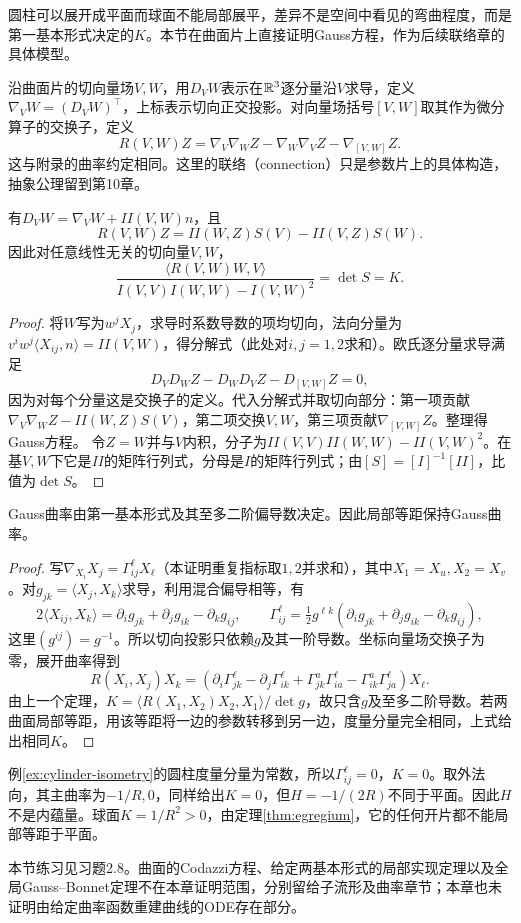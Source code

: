 圆柱可以展开成平面而球面不能局部展平，差异不是空间中看见的弯曲程度，而是第一基本形式决定的$K$。本节在曲面片上直接证明Gauss方程，作为后续联络章的具体模型。
\begin{definition}[切向投影联络与曲率]
沿曲面片的切向量场$V,W$，用$D_VW$表示在$\mathbb{R}^3$逐分量沿$V$求导，定义$\nabla_VW=(D_VW)^\top$，上标表示切向正交投影。对向量场括号$[V,W]$取其作为微分算子的交换子，定义
\[
 R(V,W)Z=\nabla_V\nabla_WZ-\nabla_W\nabla_VZ-\nabla_{[V,W]}Z.
\]
这与附录的曲率约定相同。这里的联络（connection）只是参数片上的具体构造，抽象公理留到第10章。
\end{definition}
\begin{theorem}[Gauss分解与Gauss方程]\label{thm:gauss-surface}
有$D_VW=\nabla_VW+II(V,W)n$，且
\[
 R(V,W)Z=II(W,Z)S(V)-II(V,Z)S(W).
\]
因此对任意线性无关的切向量$V,W$，
\[
 \frac{\langle R(V,W)W,V\rangle}
 {I(V,V)I(W,W)-I(V,W)^2}=\det S=K.
\]
\end{theorem}
\begin{proof}
将$W$写为$w^jX_j$，求导时系数导数的项均切向，法向分量为$v^iw^j\langle X_{ij},n\rangle=II(V,W)$，得分解式（此处对$i,j=1,2$求和）。欧氏逐分量求导满足
\[
 D_VD_WZ-D_WD_VZ-D_{[V,W]}Z=0,
\]
因为对每个分量这是交换子的定义。代入分解式并取切向部分：第一项贡献$\nabla_V\nabla_WZ-II(W,Z)S(V)$，第二项交换$V,W$，第三项贡献$\nabla_{[V,W]}Z$。整理得Gauss方程。
令$Z=W$并与$V$内积，分子为$II(V,V)II(W,W)-II(V,W)^2$。在基$V,W$下它是$II$的矩阵行列式，分母是$I$的矩阵行列式；由$[S]=[I]^{-1}[II]$，比值为$\det S$。
\end{proof}
\begin{theorem}[Gauss绝妙定理的局部形式]\label{thm:egregium}
Gauss曲率由第一基本形式及其至多二阶偏导数决定。因此局部等距保持Gauss曲率。
\end{theorem}
\begin{proof}
写$\nabla_{X_i}X_j=\Gamma^\ell_{ij}X_\ell$（本证明重复指标取$1,2$并求和），其中$X_1=X_u,X_2=X_v$。对$g_{jk}=\langle X_j,X_k\rangle$求导，利用混合偏导相等，有
\[
 2\langle X_{ij},X_k\rangle
 =\partial_i g_{jk}+\partial_j g_{ik}-\partial_k g_{ij},\qquad
 \Gamma^\ell_{ij}=\tfrac12g^{\ell k}
 (\partial_i g_{jk}+\partial_j g_{ik}-\partial_k g_{ij}),
\]
这里$(g^{ij})=g^{-1}$。所以切向投影只依赖$g$及其一阶导数。坐标向量场交换子为零，展开曲率得到
\[
 R(X_i,X_j)X_k=
 (\partial_i\Gamma^\ell_{jk}-\partial_j\Gamma^\ell_{ik}
 +\Gamma^a_{jk}\Gamma^\ell_{ia}-\Gamma^a_{ik}\Gamma^\ell_{ja})X_\ell.
\]
由上一个定理，$K=\langle R(X_1,X_2)X_2,X_1\rangle/\det g$，故只含$g$及至多二阶导数。若两曲面局部等距，用该等距将一边的参数转移到另一边，度量分量完全相同，上式给出相同$K$。
\end{proof}
\begin{example}[内蕴曲率与外在弯曲]
例\ref{ex:cylinder-isometry}的圆柱度量分量为常数，所以$\Gamma^\ell_{ij}=0$，$K=0$。取外法向，其主曲率为$-1/R,0$，同样给出$K=0$，但$H=-1/(2R)$不同于平面。因此$H$不是内蕴量。球面$K=1/R^2>0$，由定理\ref{thm:egregium}，它的任何开片都不能局部等距于平面。
\end{example}
本节练习见习题2.8。曲面的Codazzi方程、给定两基本形式的局部实现定理以及全局Gauss--Bonnet定理不在本章证明范围，分别留给子流形及曲率章节；本章也未证明由给定曲率函数重建曲线的ODE存在部分。
